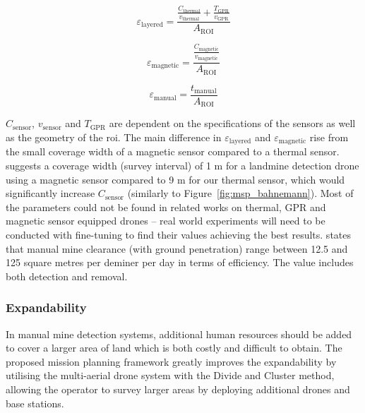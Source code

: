 \begin{equation}
\label{eq:msp_layeredefficiency}
\varepsilon_{\mathrm{layered}} = \frac{\frac{C_{\mathrm{thermal}}}{v_{\mathrm{thermal}}}+\frac{T_{\mathrm{GPR}}}{v_{\mathrm{GPR}}}}{A_{\mathrm{ROI}}}
\end{equation}

\begin{equation}
\label{eq:msp_magneticefficiency}
\varepsilon_{\mathrm{magnetic}} = \frac{\frac{C_{\mathrm{magnetic}}}{v_{\mathrm{magnetic}}}}{A_{\mathrm{ROI}}}
\end{equation}

\begin{equation}
\label{eq:msp_manualefficiency}
\varepsilon_{\mathrm{manual}} = \frac{t_{\mathrm{manual}}}{A_{\mathrm{ROI}}}
\end{equation}

$C_{\mathrm{sensor}}$, $v_{\mathrm{sensor}}$ and $T_{\mathrm{GPR}}$ are dependent on the specifications of the sensors as well as the geometry of the \gls{roi}. The main difference in $\varepsilon_{\mathrm{layered}}$ and $\varepsilon_{\mathrm{magnetic}}$ rise from the small coverage width of a magnetic sensor compared to a thermal sensor. \cite{Yoo2024UnmannedAV} suggests a coverage width (survey interval) of 1 m for a landmine detection drone using a magnetic sensor compared to 9 m for our thermal sensor, which would significantly increase $C_{\mathrm{sensor}}$ (similarly to Figure~\ref{fig:msp_bahnemann}). Most of the parameters could not be found in related works on thermal, \gls{GPR} and magnetic sensor equipped drones -- real world experiments will need to be conducted with fine-tuning to find their values achieving the best results. \cite{gichd2005manual} states that manual mine clearance (with ground penetration) range between 12.5 and 125 square metres per deminer per day in terms of efficiency. The value includes both detection and removal. 

\subsubsection{Expandability}

In manual mine detection systems, additional human resources should be added to cover a larger area of land which is both costly and difficult to obtain. The proposed mission planning framework greatly improves the expandability by utilising the multi-aerial drone system with the Divide and Cluster method, allowing the operator to survey larger areas by deploying additional drones and base stations. 

